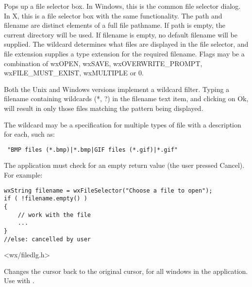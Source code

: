 
Pops up a file selector box. In Windows, this is the common file selector
dialog. In X, this is a file selector box with the same functionality.
The path and filename are distinct elements of a full file pathname.
If path is empty, the current directory will be used. If filename is empty,
no default filename will be supplied. The wildcard determines what files
are displayed in the file selector, and file extension supplies a type
extension for the required filename. Flags may be a combination of wxOPEN,
wxSAVE, wxOVERWRITE\_PROMPT, wxFILE\_MUST\_EXIST, wxMULTIPLE or 0.

Both the Unix and Windows versions implement a wildcard filter. Typing a
filename containing wildcards (*, ?) in the filename text item, and
clicking on Ok, will result in only those files matching the pattern being
displayed.

The wildcard may be a specification for multiple types of file
with a description for each, such as:

\begin{verbatim}
 "BMP files (*.bmp)|*.bmp|GIF files (*.gif)|*.gif"
\end{verbatim}

The application must check for an empty return value (the user pressed
Cancel). For example:

\begin{verbatim}
wxString filename = wxFileSelector("Choose a file to open");
if ( !filename.empty() )
{
    // work with the file
    ...
}
//else: cancelled by user
\end{verbatim}


<wx/filedlg.h>


\label{wxendbusycursor}


Changes the cursor back to the original cursor, for all windows in the application.
Use with .

